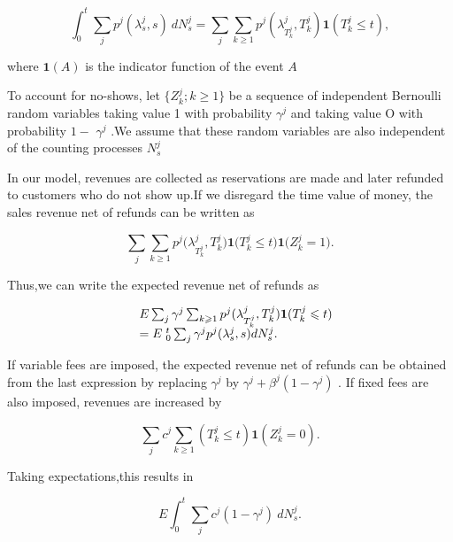 \[
\int _ { 0 } ^ { t } \sum _ { j } p ^ { j } ( \lambda _ { s } ^ { j } , s ) \ d N _ { s } ^ { j } = \sum _ { j } \sum _ { k \geqslant 1 } p ^ { j } ( \lambda _ { T _ { k } ^ { j } } ^ { j } , T _ { k } ^ { j } ) \mathbf { 1 } ( T _ { k } ^ { j } \leqslant t ) ,
\]

where \(\mathbf { 1 } ( A )\) is the indicator function of the event
\(A\)

To account for no-shows, let \(\{ Z _ { k } ^ { j } ; k \ge 1 \}\) be a
sequence of independent Bernoulli random variables taking value 1 with
probability \(\gamma ^ { j }\) and taking value O with probability
\(1 -\) \(\gamma ^ { j }\) .We assume that these random variables are
also independent of the counting processes \(N _ { s } ^ { j }\)

In our model, revenues are collected as reservations are made and later
refunded to customers who do not show up.If we disregard the time value
of money, the sales revenue net of refunds can be written as

\[
\sum _ { j } \sum _ { k \geqslant 1 } p ^ { j } \big ( \lambda _ { T _ { k } ^ { j } } ^ { j } , T _ { k } ^ { j } \big ) \mathbf { 1 } \big ( T _ { k } ^ { j } \leqslant t \big ) \mathbf { 1 } \big ( Z _ { k } ^ { j } = 1 \big ) .
\]

Thus,we can write the expected revenue net of refunds as

\[
\begin{array} { r l } { { } } & { { E \sum _ { j } \gamma ^ { j } \sum _ { k \geqslant 1 } p ^ { j } ( \lambda _ { T _ { k } ^ { j } } ^ { j } , T _ { k } ^ { j } ) \mathbf { 1 } ( T _ { k } ^ { j } \leqslant t ) } } \\ { { } } & { { = E \left. _ { 0 } ^ { t } \sum _ { j } \gamma ^ { j } p ^ { j } ( \lambda _ { s } ^ { j } , s ) d N _ { s } ^ { j } . \right. } } \end{array}
\]

If variable fees are imposed, the expected revenue net of refunds can be
obtained from the last expression by replacing \(\gamma ^ { j }\) by
\(\gamma ^ { j } + \beta ^ { j } ( 1 - \gamma ^ { j } )\) . If fixed
fees are also imposed, revenues are increased by

\[
\sum _ { j } c ^ { j } \sum _ { k \geq 1 } ( T _ { k } ^ { j } \leqslant t ) \mathbf { 1 } ( Z _ { k } ^ { j } = 0 ) .
\]

Taking expectations,this results in

\[
E \int _ { 0 } ^ { t } \sum _ { j } c ^ { j } ( 1 - \gamma ^ { j } ) \ d N _ { s } ^ { j } .
\]

